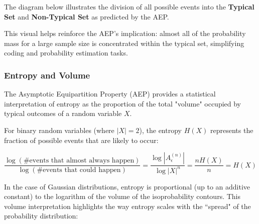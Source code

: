 The diagram below illustrates the division of all possible events into the \textbf{Typical Set} and \textbf{Non-Typical Set} as predicted by the AEP.

\begin{center}
\end{center}

This visual helps reinforce the AEP’s implication: almost all of the probability mass for a large sample size is concentrated within the typical set, simplifying coding and probability estimation tasks.


\subsubsection{Entropy and Volume}

The Asymptotic Equipartition Property (AEP) provides a statistical interpretation of entropy as the proportion of the total "volume" occupied by typical outcomes of a random variable \( X \). \bigskip


For binary random variables (where \(|X| = 2\)), the entropy \( H(X) \) represents the fraction of possible events that are likely to occur:

\[
    \frac{\log(\text{\# events that almost always happen})}{\log(\text{\# events that could happen})} = \frac{\log |A^{(n)}_\epsilon|}{\log |X|^n} = \frac{n H(X)}{n} = H(X)
\]

In the case of Gaussian distributions, entropy is proportional (up to an additive constant) to the logarithm of the volume of the isoprobability contours. This volume interpretation highlights the way entropy scales with the ``spread" of the probability distribution:

